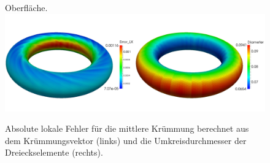 \begin{figure}
{             Oberfläche.}
    \label{figErrCompHeineB}
    \centering\includegraphics[width=\textwidth]{bilder/Curvature/LXDiameterTorus.png}
    \caption[Diameter u. Fehler f. Krümmungsvektor (Torus)]
            {Absolute lokale Fehler für die mittlere Krümmung berechnet aus dem Krümmungsvektor (links) und die Umkreisdurchmesser der
            Dreieckselemente (rechts).}
    \label{figLXDiameterTorus}
  \end{figure}

